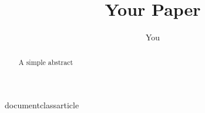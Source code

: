 documentclass{article}

\usepackage[english]{babel}

\usepackage[a4,top=2cm,bottom=2cm,left=3cm,right=3cm,marginparwidth=1.75cm]{geometry}

\usepackage{amsmath}

\usepackage{graphicx}

\usepackage[colorlinks=true, allcolors=blue]{hyperref}

\title{Your Paper}

\author{You}



\maketitle

\begin{abstract}

A simple abstract

\end{abstract}













